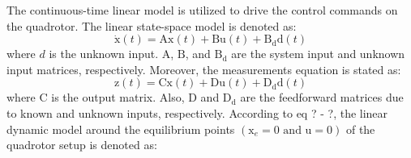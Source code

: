 \documentclass[conference]{IEEEtran}
\begin{document}
The continuous-time linear model is utilized to drive the control commands on the quadrotor. The linear state-space model is denoted as:
\begin{equation}
	\boldsymbol{\dot{\mathrm{x}}}(t) = \boldsymbol{\mathrm{Ax}}(t) + \boldsymbol{\mathrm{Bu}}(t) + \boldsymbol{\mathrm{B_{d}d}}(t)
\end{equation}
where $d$ is the unknown input. $\boldsymbol{\mathrm{A}}$, $\boldsymbol{\mathrm{B}}$, and $\boldsymbol{\mathrm{B_d}}$ are the system input and unknown input matrices, respectively. Moreover, the measurements equation is stated as:
\begin{equation}
	\boldsymbol{{\mathrm{z}}}(t) = \boldsymbol{\mathrm{Cx}}(t) + \boldsymbol{\mathrm{Du}}(t) + \boldsymbol{\mathrm{D_{d}d}}(t)
\end{equation}
where $\boldsymbol{\mathrm{C}}$ is the output matrix. Also, $\boldsymbol{\mathrm{D}}$ and $\boldsymbol{\mathrm{D_d}}$ are the feedforward matrices due to known and unknown inputs, respectively. 
According to eq ? - ?, the linear dynamic model around the equilibrium points $(\boldsymbol{{\mathrm{x}}}_e = 0 \text{ and } \boldsymbol{{\mathrm{u}}} = 0)$ of the quadrotor setup is denoted as:
\end{document}
